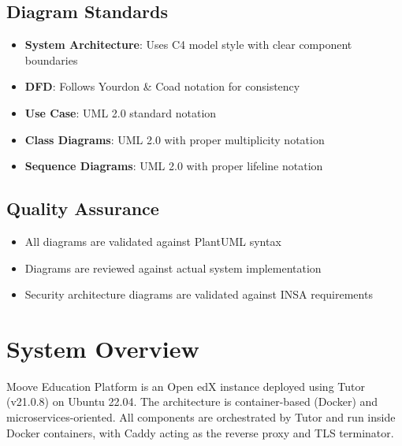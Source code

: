 \subsection{Diagram Standards}
\begin{itemize}
    \item \textbf{System Architecture}: Uses C4 model style with clear component boundaries
    \item \textbf{DFD}: Follows Yourdon \& Coad notation for consistency
    \item \textbf{Use Case}: UML 2.0 standard notation
    \item \textbf{Class Diagrams}: UML 2.0 with proper multiplicity notation
    \item \textbf{Sequence Diagrams}: UML 2.0 with proper lifeline notation
\end{itemize}

\subsection{Quality Assurance}
\begin{itemize}
    \item All diagrams are validated against PlantUML syntax
    \item Diagrams are reviewed against actual system implementation
    \item Security architecture diagrams are validated against INSA requirements
\end{itemize}

\section{System Overview}
Moove Education Platform is an Open edX instance deployed using Tutor (v21.0.8) on Ubuntu 22.04. The architecture is container-based (Docker) and microservices-oriented. All components are orchestrated by Tutor and run inside Docker containers, with Caddy acting as the reverse proxy and TLS terminator.


